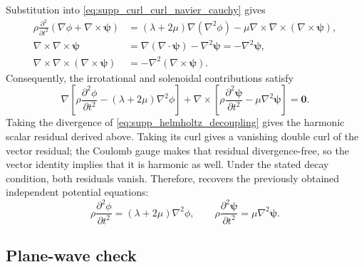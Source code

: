 Substitution into \cref{eq:supp_curl_curl_navier_cauchy} gives
\begin{equation*}
  \begin{aligned}
    \rho\frac{\partial^2}{\partial t^2}
    \left(\nabla\phi + \nabla \times \boldsymbol{\psi}\right)
    & = (\lambda + 2\mu)\nabla(\nabla^2\phi) - \mu\nabla \times \nabla \times
    \left(\nabla \times \boldsymbol{\psi}\right), \\
    \nabla \times \nabla \times \boldsymbol{\psi}
    & = \nabla(\nabla \cdot \boldsymbol{\psi}) - \nabla^2\boldsymbol{\psi}
    = -\nabla^2\boldsymbol{\psi}, \\
    \nabla \times \nabla \times \left(\nabla \times \boldsymbol{\psi}\right)
    & = -\nabla^2\left(\nabla \times \boldsymbol{\psi}\right).
  \end{aligned}
\end{equation*}
Consequently, the irrotational and solenoidal contributions satisfy
\begin{equation}
  \nabla\left[\rho\frac{\partial^2\phi}{\partial t^2}
  - (\lambda + 2\mu)\nabla^2\phi\right]
  + \nabla \times \left[\rho\frac{\partial^2\boldsymbol{\psi}}{\partial t^2}
  - \mu\nabla^2\boldsymbol{\psi}\right] = \mathbf{0}.
  \label{eq:supp_helmholtz_decoupling}
\end{equation}
Taking the divergence of \cref{eq:supp_helmholtz_decoupling} gives the
harmonic scalar residual derived above. Taking its curl gives a vanishing
double curl of the vector residual; the Coulomb gauge makes that residual
divergence-free, so the vector identity implies that it is harmonic as well.
Under the stated decay condition, both residuals vanish. Therefore,
 recovers the previously obtained
independent potential equations:
\begin{equation}
  \rho\frac{\partial^2\phi}{\partial t^2} = (\lambda + 2\mu)\nabla^2\phi,\qquad
  \rho\frac{\partial^2\boldsymbol{\psi}}{\partial t^2} =
  \mu\nabla^2\boldsymbol{\psi}.
\end{equation}

\subsection*{Plane-wave check}

